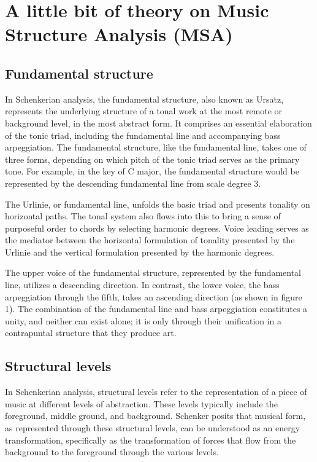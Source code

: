 \chapter{A little bit of theory on Music Structure Analysis (MSA)}

\section{Fundamental structure}

In Schenkerian analysis, the fundamental structure, also known as Ursatz, represents the underlying structure of a tonal work at the most remote or background level, in the most abstract form. It comprises an essential elaboration of the tonic triad, including the fundamental line and accompanying bass arpeggiation. The fundamental structure, like the fundamental line, takes one of three forms, depending on which pitch of the tonic triad serves as the primary tone. For example, in the key of C major, the fundamental structure would be represented by the descending fundamental line from scale degree 3.

The Urlinie, or fundamental line, unfolds the basic triad and presents tonality on horizontal paths. The tonal system also flows into this to bring a sense of purposeful order to chords by selecting harmonic degrees. Voice leading serves as the mediator between the horizontal formulation of tonality presented by the Urlinie and the vertical formulation presented by the harmonic degrees.

The upper voice of the fundamental structure, represented by the fundamental line, utilizes a descending direction. In contrast, the lower voice, the bass arpeggiation through the fifth, takes an ascending direction (as shown in figure 1). The combination of the fundamental line and bass arpeggiation constitutes a unity, and neither can exist alone; it is only through their unification in a contrapuntal structure that they produce art.

\section{Structural levels}

In Schenkerian analysis, structural levels refer to the representation of a piece of music at different levels of abstraction. These levels typically include the foreground, middle ground, and background. Schenker posits that musical form, as represented through these structural levels, can be understood as an energy transformation, specifically as the transformation of forces that flow from the background to the foreground through the various levels.

